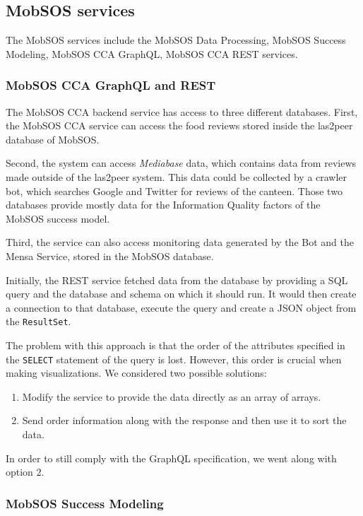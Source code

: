\subsection{MobSOS services}
The MobSOS services include the MobSOS Data Processing, MobSOS Success Modeling, MobSOS CCA GraphQL, MobSOS CCA REST services.

\subsubsection{MobSOS CCA GraphQL and REST}
The MobSOS CCA backend service has access to three different databases. First, the MobSOS CCA service can access the food reviews stored inside the las2peer database of MobSOS.

Second, the system can access \emph{Mediabase} data, which contains data from reviews made outside of the las2peer system. 
This data could be collected by a crawler bot, which searches Google and Twitter for reviews of the canteen. 
Those two databases provide mostly data for the Information Quality factors of the MobSOS success model.

Third, the service can also access monitoring data generated by the Bot and the Mensa Service, stored in the MobSOS database. 

Initially, the REST service fetched data from the database by providing a SQL query and the database and schema on which it should run. It would then create a connection to that database, execute the query and create a JSON object from the \texttt{ResultSet}. 

The problem with this approach is that the order of the attributes specified in the \texttt{SELECT} statement of the query is lost.
However, this order is crucial when making visualizations. 
We considered two possible solutions:
\begin{enumerate}
    \item Modify the service to provide the data directly as an array of arrays.
    \item Send order information along with the response and then use it to sort the data.
\end{enumerate}
In order to still comply with the GraphQL specification, we went along with option 2. 




\subsubsection{MobSOS Success Modeling}

